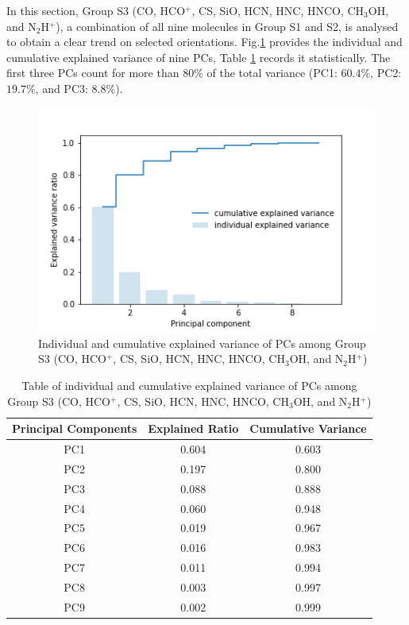 \documentclass{aa}
\begin{document}
\begin{CJK*}{UTF8}{gbsn}
    In this section, Group S3 (CO, HCO$^+$, CS, SiO, HCN, HNC, HNCO, CH$_3$OH, and N$_2$H$^+$), a combination of all nine molecules in Group S1 and S2, is analysed to obtain a clear trend on selected orientations. 
    Fig.\ref{Fig-shock3-varianve} provides the individual and cumulative explained variance of nine PCs, Table \ref{table-shock-3-1} records it statistically. The first three PCs count for more than $80\%$ of the total variance (PC1: $60.4\%$, PC2: $19.7\%$, and PC3: $8.8\%$). 

  \begin{figure}[htbp]
   \centering
   \captionsetup{justification=centering}
   \includegraphics[angle=0,scale =0.6]{shock-3/explained_variance_ratio.png}
   \caption{Individual and cumulative explained variance of PCs among Group S3 (CO, HCO$^+$, CS, SiO, HCN, HNC, HNCO, CH$_3$OH, and N$_2$H$^+$)}
         \label{Fig-shock3-varianve}
   \end{figure}
   

\begin{table}[htbp]
\centering
\begin{tabular}{ccc}
\hline\hline
\multicolumn{1}{l}{Principal Components} & \multicolumn{1}{l}{Explained Ratio} & Cumulative Variance \\ \hline
        PC1 & 0.604  & 0.603\\ 
        PC2 & 0.197  & 0.800\\
        PC3 & 0.088  & 0.888\\
        PC4 & 0.060  & 0.948\\ 
        PC5 & 0.019  & 0.967\\
        PC6 & 0.016  & 0.983\\
        PC7 & 0.011  & 0.994\\
        PC8 & 0.003  & 0.997\\
        PC9 & 0.002  & 0.999\\\hline\hline
\end{tabular}
\caption{Table of individual and cumulative explained variance of PCs among Group S3 (CO, HCO$^+$, CS, SiO, HCN, HNC, HNCO, CH$_3$OH, and N$_2$H$^+$)}
\label{table-shock-3-1}
\end{table}


\end{CJK*}
\end{document}
